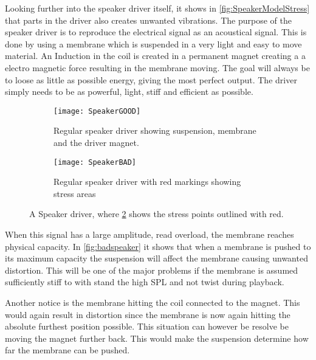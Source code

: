 Looking further into the speaker driver itself, it shows in \autoref{fig:SpeakerModelStress} that parts in the driver also creates unwanted vibrations. The purpose of the speaker driver is to reproduce the electrical signal as an acoustical signal. This is done by using a membrane which is suspended in a very light and easy to move material. An Induction in the coil is created in a permanent magnet creating a a electro magnetic force resulting in the membrane moving. The goal will always be to loose as little as possible energy, giving the most perfect output. The driver simply needs to be as powerful, light, stiff and efficient as possible.

\begin{figure}[H]
\centering
\begin{subfigure}[t]{0.47\textwidth}
\texttt{[image: SpeakerGOOD]}
	\caption{Regular speaker driver showing suspension, membrane and the driver magnet.}
	\label{fig:regularspeaker}
\end{subfigure}
\hspace{6mm} 
\begin{subfigure}[t]{0.47\textwidth}
\texttt{[image: SpeakerBAD]}
	\caption{Regular speaker driver with red markings showing stress areas}
	\label{fig:badspeaker}
\end{subfigure}
\caption{A Speaker driver, where \ref{fig:badspeaker} shows the stress points outlined with red.}
\label{fig:SpeakerModelStress}
\end{figure}

When this signal has a large amplitude, read overload, the membrane reaches physical capacity. In \autoref{fig:badspeaker} it shows that when a membrane is pushed to its maximum capacity the suspension will affect the membrane causing unwanted distortion. This will be one of the major problems if the membrane is assumed sufficiently stiff to with stand the high \gls{SPL} and not twist during playback. 

Another notice is the membrane hitting the coil connected to the magnet. This would again result in distortion since the membrane is now again hitting the absolute furthest position possible. This situation can however be resolve be moving the magnet further back. This would make the suspension determine how far the membrane can be pushed.

% 


